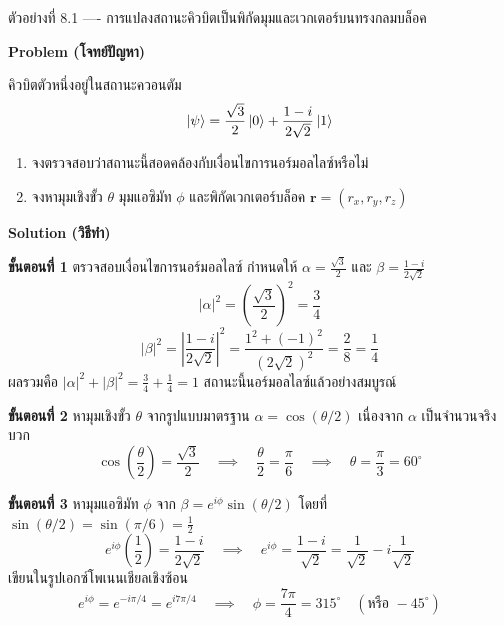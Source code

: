 \begin{psctbox}{ตัวอย่างที่ 8.1 ---- การแปลงสถานะคิวบิตเป็นพิกัดมุมและเวกเตอร์บนทรงกลมบล็อค}

\textbf{Problem (โจทย์ปัญหา)}

คิวบิตตัวหนึ่งอยู่ในสถานะควอนตัม
\begin{equation*}
\ket{\psi} = \frac{\sqrt{3}}{2} \ket{0} + \frac{1 - i}{2\sqrt{2}} \ket{1}
\end{equation*}
\begin{enumerate}
    \item จงตรวจสอบว่าสถานะนี้สอดคล้องกับเงื่อนไขการนอร์มอลไลซ์หรือไม่
    \item จงหามุมเชิงขั้ว $\theta$ มุมแอซิมัท $\phi$ และพิกัดเวกเตอร์บล็อค $\mathbf{r} = (r_x, r_y, r_z)$
\end{enumerate}

\textbf{Solution (วิธีทำ)}

\textbf{ขั้นตอนที่ 1} ตรวจสอบเงื่อนไขการนอร์มอลไลซ์
กำหนดให้ $\alpha = \frac{\sqrt{3}}{2}$ และ $\beta = \frac{1 - i}{2\sqrt{2}}$
\begin{equation*}
|\alpha|^2 = \left( \frac{\sqrt{3}}{2} \right)^2 = \frac{3}{4}
\end{equation*}
\begin{equation*}
|\beta|^2 = \left| \frac{1 - i}{2\sqrt{2}} \right|^2 = \frac{1^2 + (-1)^2}{(2\sqrt{2})^2} = \frac{2}{8} = \frac{1}{4}
\end{equation*}
ผลรวมคือ $|\alpha|^2 + |\beta|^2 = \frac{3}{4} + \frac{1}{4} = 1$ สถานะนี้นอร์มอลไลซ์แล้วอย่างสมบูรณ์

\textbf{ขั้นตอนที่ 2} หามุมเชิงขั้ว $\theta$
จากรูปแบบมาตรฐาน $\alpha = \cos(\theta/2)$ เนื่องจาก $\alpha$ เป็นจำนวนจริงบวก
\begin{equation*}
\cos\left(\frac{\theta}{2}\right) = \frac{\sqrt{3}}{2} \quad \implies \quad \frac{\theta}{2} = \frac{\pi}{6} \quad \implies \quad \theta = \frac{\pi}{3} = 60^\circ
\end{equation*}

\textbf{ขั้นตอนที่ 3} หามุมแอซิมัท $\phi$
จาก $\beta = e^{i\phi} \sin(\theta/2)$ โดยที่ $\sin(\theta/2) = \sin(\pi/6) = \frac{1}{2}$
\begin{equation*}
e^{i\phi} \left(\frac{1}{2}\right) = \frac{1 - i}{2\sqrt{2}} \quad \implies \quad e^{i\phi} = \frac{1 - i}{\sqrt{2}} = \frac{1}{\sqrt{2}} - i\frac{1}{\sqrt{2}}
\end{equation*}
เขียนในรูปเอกซ์โพเนนเชียลเชิงซ้อน
\begin{equation*}
e^{i\phi} = e^{-i\pi/4} = e^{i 7\pi/4} \quad \implies \quad \phi = \frac{7\pi}{4} = 315^\circ \quad (\text{หรือ } -45^\circ)
\end{equation*}


\end{psctbox}

